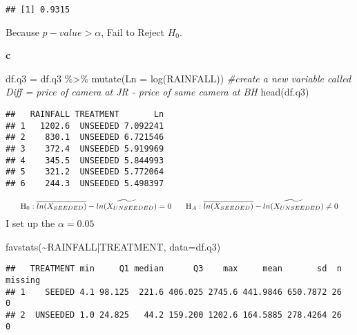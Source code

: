 \documentclass[
]{article}
\newenvironment{Shaded}{\begin{snugshade}}{\end{snugshade}}
\newcommand{\AttributeTok}[1]{\textcolor[rgb]{0.77,0.63,0.00}{#1}}
\newcommand{\CommentTok}[1]{\textcolor[rgb]{0.56,0.35,0.01}{\textit{#1}}}
\newcommand{\FunctionTok}[1]{\textcolor[rgb]{0.00,0.00,0.00}{#1}}
\newcommand{\NormalTok}[1]{#1}
\newcommand{\OtherTok}[1]{\textcolor[rgb]{0.56,0.35,0.01}{#1}}
\newcommand{\SpecialCharTok}[1]{\textcolor[rgb]{0.00,0.00,0.00}{#1}}
\begin{document}
\begin{verbatim}
## [1] 0.9315
\end{verbatim}

Because \(p-value > \alpha\), Fail to Reject \(H_{0}\).

\textbf{c}

\begin{Shaded}
\begin{Highlighting}[]
\NormalTok{df.q3 }\OtherTok{=}\NormalTok{ df.q3 }\SpecialCharTok{\%\textgreater{}\%}
  \FunctionTok{mutate}\NormalTok{(}\AttributeTok{Ln =} \FunctionTok{log}\NormalTok{(RAINFALL)) }\CommentTok{\#create a new variable called Diff = price of camera at JR {-} price of same camera at BH}
\FunctionTok{head}\NormalTok{(df.q3)}
\end{Highlighting}
\end{Shaded}

\begin{verbatim}
##   RAINFALL TREATMENT       Ln
## 1   1202.6  UNSEEDED 7.092241
## 2    830.1  UNSEEDED 6.721546
## 3    372.4  UNSEEDED 5.919969
## 4    345.5  UNSEEDED 5.844993
## 5    321.2  UNSEEDED 5.772064
## 6    244.3  UNSEEDED 5.498397
\end{verbatim}

\[
\hspace{0.25in}  {\rm H}_{0}: \overline{ln(X_{SEEDED})} - \widetilde{ln(X_{UNSEEDED})} = 0 \hspace{0.25in} 
\\
\hspace{0.25in} {\rm H}_{A}: \overline{ln(X_{SEEDED})} - \widetilde{ln(X_{UNSEEDED})} \neq 0 \hspace{0.25in} 
\] I set up the \(\alpha = 0.05\)

\begin{Shaded}
\begin{Highlighting}[]
\FunctionTok{favstats}\NormalTok{(}\SpecialCharTok{\textasciitilde{}}\NormalTok{RAINFALL}\SpecialCharTok{|}\NormalTok{TREATMENT, }\AttributeTok{data=}\NormalTok{df.q3)}
\end{Highlighting}
\end{Shaded}

\begin{verbatim}
##   TREATMENT min     Q1 median      Q3    max     mean       sd  n missing
## 1    SEEDED 4.1 98.125  221.6 406.025 2745.6 441.9846 650.7872 26       0
## 2  UNSEEDED 1.0 24.825   44.2 159.200 1202.6 164.5885 278.4264 26       0
\end{verbatim}
\end{document}
